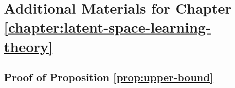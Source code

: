 
\ifpdf
    \graphicspath{{Appendix3/Figs/Raster/}{Appendix3/Figs/PDF/}{Appendix3/Figs/}}
\else
    \graphicspath{{Appendix3/Figs/Vector/}{Appendix3/Figs/}}
\fi


\chapter{Additional Materials for Chapter \ref{chapter:latent-space-learning-theory}}\label{chapter:appendix-latex-space-learning-theory}

\section{Proof of Proposition \ref{prop:upper-bound}}\label{proof:prop1}

